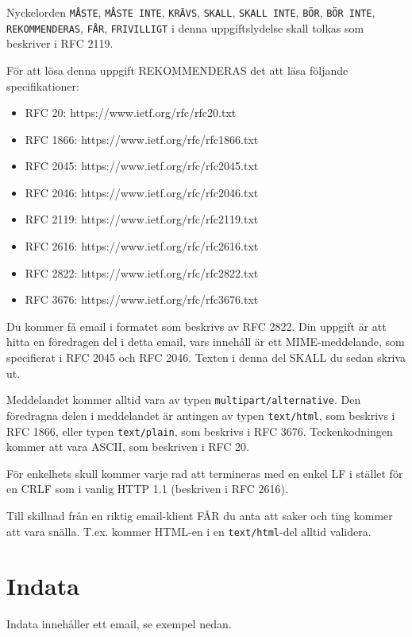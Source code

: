 
Nyckelorden \texttt{MÅSTE}, \texttt{MÅSTE INTE}, \texttt{KRÄVS}, \texttt{SKALL}, \texttt{SKALL INTE}, \texttt{BÖR}, \texttt{BÖR INTE}, \texttt{REKOMMENDERAS}, \texttt{FÅR}, \texttt{FRIVILLIGT} i denna uppgiftslydelse skall tolkas som beskriver i RFC 2119.

För att lösa denna uppgift REKOMMENDERAS det att läsa följande specifikationer:
\begin{itemize}
	\item RFC 20: https://www.ietf.org/rfc/rfc20.txt
	\item RFC 1866: https://www.ietf.org/rfc/rfc1866.txt
	\item RFC 2045: https://www.ietf.org/rfc/rfc2045.txt
	\item RFC 2046: https://www.ietf.org/rfc/rfc2046.txt
	\item RFC 2119: https://www.ietf.org/rfc/rfc2119.txt
	\item RFC 2616: https://www.ietf.org/rfc/rfc2616.txt
	\item RFC 2822: https://www.ietf.org/rfc/rfc2822.txt
	\item RFC 3676: https://www.ietf.org/rfc/rfc3676.txt
\end{itemize}

Du kommer få email i formatet som beskrivs av RFC 2822.  Din uppgift är att hitta en föredragen del i detta email, vars innehåll är ett MIME-meddelande, som specifierat i RFC 2045 och RFC 2046. Texten i denna del SKALL du sedan skriva ut.

Meddelandet kommer alltid vara av typen \texttt{multipart/alternative}. Den föredragna delen i meddelandet är antingen av typen \texttt{text/html}, som beskrivs i RFC 1866, eller typen \texttt{text/plain}, som beskrivs i RFC 3676. Teckenkodningen kommer att vara ASCII, som beskriven i RFC 20.


För enkelhets skull kommer varje rad att termineras med en enkel LF i stället för en CRLF som i vanlig HTTP 1.1 (beskriven i RFC 2616).

Till skillnad från en riktig email-klient FÅR du anta att saker och ting kommer att vara snälla. T.ex. kommer HTML-en i en \texttt{text/html}-del alltid validera.

\section*{Indata}
Indata innehåller ett email, se exempel nedan.

